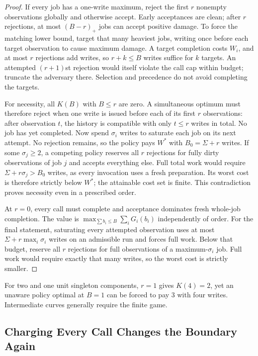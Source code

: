 \begin{proof}
If every job has a one-write maximum, reject the first $r$ nonempty observations globally and otherwise accept. Early acceptances are clean; after $r$ rejections, at most $(B-r)_+$ jobs can accept positive damage. To force the matching lower bound, target that many heaviest jobs, writing once before each target observation to cause maximum damage. A target completion costs $W_i$, and at most $r$ rejections add writes, so $r+k\le B$ writes suffice for $k$ targets. An attempted $(r+1)$st rejection would itself violate the call cap within budget; truncate the adversary there. Selection and precedence do not avoid completing the targets.

For necessity, all $K(B)$ with $B\le r$ are zero. A simultaneous optimum must therefore reject when one write is issued before each of its first $r$ observations: after observation $t$, the history is compatible with only $t\le r$ writes in total. No job has yet completed. Now spend $\sigma_i$ writes to saturate each job on its next attempt. No rejection remains, so the policy pays $W^*$ with $B_0=\Sigma+r$ writes. If some $\sigma_j\ge2$, a competing policy reserves all $r$ rejections for fully dirty observations of job $j$ and accepts everything else. Full total work would require $\Sigma+r\sigma_j>B_0$ writes, as every invocation uses a fresh preparation. Its worst cost is therefore strictly below $W^*$; the attainable cost set is finite. This contradiction proves necessity even in a prescribed order.

At $r=0$, every call must complete and acceptance dominates fresh whole-job completion. The value is $\max_{\sum b_i\le B}\sum_iG_i(b_i)$ independently of order. For the final statement, saturating every attempted observation uses at most $\Sigma+r\max_i\sigma_i$ writes on an admissible run and forces full work. Below that budget, reserve all $r$ rejections for full observations of a maximum-$\sigma_i$ job. Full work would require exactly that many writes, so the worst cost is strictly smaller.
\end{proof}

For two and one unit singleton components, $r=1$ gives $K(4)=2$, yet an unaware policy optimal at $B=1$ can be forced to pay 3 with four writes. Intermediate curves generally require the finite game.

\subsection{Charging Every Call Changes the Boundary Again}
\label{sec:toll}

